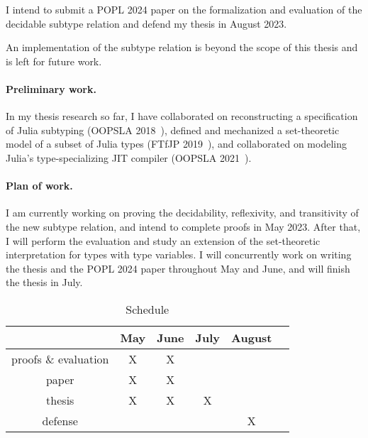 I intend to submit a POPL 2024 paper on the formalization and evaluation of
the decidable subtype relation and defend my thesis in August 2023.

An implementation of the subtype relation is beyond the scope of this thesis and
is left for future work.


\paragraph*{Preliminary work.}
In my thesis research so far,
I have collaborated on reconstructing a specification of Julia subtyping
(OOPSLA 2018~\cite{TODO}),
defined and mechanized a set-theoretic model of a subset of Julia types
(FTfJP 2019~\cite{TODO}),
and collaborated on modeling Julia's type-specializing JIT compiler
(OOPSLA 2021~\cite{TODO}).

\paragraph*{Plan of work.}
I am currently working on proving the decidability, reflexivity,
and transitivity of the new subtype relation,
and intend to complete proofs in May 2023.
After that, I will perform the evaluation
and study an extension of the set-theoretic interpretation
for types with type variables.
I will concurrently work on writing the thesis and the POPL 2024 paper
throughout May and June, and will finish the thesis in July.

\begin{table}[h]
  \caption{Schedule}
  \vspace*{0.25em}
  \centering\footnotesize
  \begin{tabular}{c|ccccc}
  \toprule
  & May & June & July & August \\
  \midrule
  proofs \& evaluation & X & X & & \\
  paper & X & X & & \\
  thesis & X & X & X & \\
  defense & & & & X \\
\end{tabular}
\end{table}

